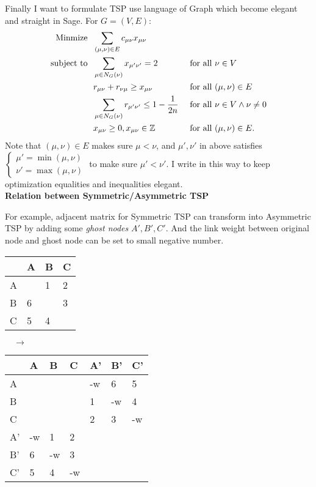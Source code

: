 \documentclass{mcmthesis}
\begin{document}
Finally I want to formulate TSP use language of Graph which become elegant and straight in Sage. For $G=(V,E)$:
\begin{align}
	\mathop{\mathrm{Minmize \ \  }}       & \sum_{(\mu,\nu)\in E} c_{\mu \nu}x_{\mu \nu}                &  & \notag                                                \\
	\mathop{\mathrm{subject \  to \ \  }} & \sum_{\mu \in N_G(\nu)} x_{\mu' \nu'}=2                     &  & \text{ for all } \nu \in V   \notag                   \\
	                                      & r_{\mu \nu} + r_{\nu \mu} \ge x_{\mu \nu}                   &  & \text{ for all } (\mu, \nu) \in E \notag              \\
	                                      & \sum_{ \mu \in  N_G(\nu)} r_{\mu' \nu'}\le 1-\dfrac{1}{2n} &  & \text{ for all } \nu \in V \wedge \nu \ne 0    \notag \\
	                                      & x_{\mu \nu} \geq 0, x_{\mu \nu} \in \mathbb{Z}                    &  & \text{ for all } (\mu, \nu) \in E. \notag
\end{align}
Note that $ (\mu, \nu) \in E$ makes sure $\mu <\nu$, and $\mu',\nu'$ in above satisfies  $\begin{cases}
\mu'=\min(\mu,\nu) \\
\nu'=\max(\mu,\nu)
\end{cases}$ to make sure  $\mu' <\nu'$. I write in this way to keep optimization equalities and inequalities elegant. \vspace{1em}
\\{\textbf{\large Relation between Symmetric/Asymmetric TSP}} \label{relation}

For example\cite{bib:wiki/tsp}, adjacent matrix for Symmetric TSP can transform into Asymmetric TSP by adding some\textit{ ghost nodes}  $A', B', C'$. And the link weight between original node and ghost node can be set to  small negative number. 
\begin{center}
\begin{tabular}{|l|l|l|l|}
	\hline
	& A & B & C \\ \hline
	A &   & 1 & 2 \\ \hline
	B & 6 &   & 3 \\ \hline
	C & 5 & 4 &   \\ \hline
\end{tabular} $\quad \rightarrow \quad $
\begin{tabular}{|l|l|l|l|l|l|l|}
	\hline
	&A  & B  & C  & A' & B' & C'     \\ \hline
	A  &    &    &    & -w & 6  & 5  \\ \hline
	B  &    &    &    & 1  & -w & 4  \\ \hline
	C  &    &    &    & 2  & 3  & -w \\ \hline
	A' & -w & 1  & 2  &    &    &    \\ \hline
	B' & 6  & -w & 3  &    &    &    \\ \hline
	C' & 5  & 4  & -w &    &    &    \\ \hline
\end{tabular}
\end{center}
\end{document}
